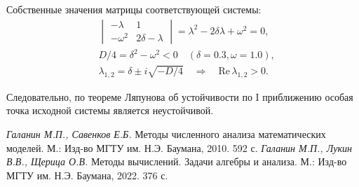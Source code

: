 \documentclass[12pt, a4paper]{article}
\begin{document}
	Собственные значения матрицы соответствующей системы:
	\begin{eqnarray*}
		& \begin{vmatrix}
			-\lambda  & 1                 \\
			-\omega^2 & 2\delta - \lambda
		\end{vmatrix} = \lambda^2 - 2 \delta\lambda + \omega^2 = 0, \\
		& D/4 = \delta^2 - \omega^2 < 0 \quad (\delta = 0.3, \omega = 1.0), \\
		& \lambda_{1,2} = \delta \pm i \sqrt{-D/4} \quad \Rightarrow \quad \mathrm{Re}\,\lambda_{1,2} > 0.
	\end{eqnarray*}
	
	Следовательно, по теореме Ляпунова об устойчивости по I приближению особая точка исходной системы является неустойчивой.
	
	
	\clearpage
	\begin{thebibliography}{1}
		 \textit{Галанин М.П., Савенков Е.Б.} Методы численного анализа математических\\ моделей. М.: Изд-во МГТУ им. Н.Э. Баумана, 2010. 592 с.
		 \textit{Галанин М.П., Лукин В.В., Щерица О.В.} Методы вычислений. Задачи алгебры и анализа. М.: Изд-во МГТУ им. Н.Э. Баумана, 2022. 376 с.
		
		
	\end{thebibliography}
	
	
\end{document}

